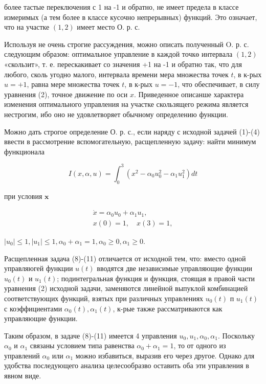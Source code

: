 \documentclass[10pt]{article}
\begin{document}
более тастые переключения с 1 на -1 и обратно, не имеет предела в классе измеримых (а тем более в классе кусочно непрерывных) функций. Это означает, что на участке $(1,2)$ имеет место О. р. с.

Используя не очень строгие рассуждения, можно описать полученный O. р. с. следующим образом: оптимальное управление в каждой точкө интервала $(1,2)$ «скользит», т. е. перескакивает со значения +1 на -1 и обратно так, что для любого, сколь угодно малого, интервала времени мера множества точек $t$, в к-рых $u=+1$, равна мере множества точек $t$, в к-рых $u=-1$, что обеспечивает, в силу уравнения (2), точное движение по оси $x$. Приведенное описанше характера изменения оптимального управления на участке скользящего режима является нестрогим, ибо оно не удовлетворяет обычному определению функции.

Можно дать строгое определение О. р. с., если наряду с исходной задачей (1)-(4) ввести в рассмотрение вспомогательную, расщепленную задачу: найти минимум функционала

\[
I(x, \alpha, u)=\int_{0}^{3}\left(x^{2}-\alpha_{0} u_{0}^{2}-\alpha_{1} u_{1}^{2}\right) d t
\]

при условия $\mathbf{x}$

\[
\begin{gathered}
\dot{x}=\alpha_{0} u_{0}+\alpha_{1} u_{1}, \\
x(0)=1, \quad x(3)=1,
\end{gathered}
\]

$\left|u_{0}\right| \leqslant 1,\left|u_{1}\right| \leqslant 1, \alpha_{0}+\alpha_{1}=1, \alpha_{0} \geqslant 0, \alpha_{1} \geqslant 0$.

Расщепленная задача (8)-(11) отличается от исходной тем, что: вместо одной управляюгей функции $u(t)$ вводятся две независимые управляющие функции $u_{0}(t)$ и $u_{1}(t)$; подинтегральная функция и функция, стоящая в правой части уравнения (2) исходной задачи, заменяются линейной выпуклой комбинацией соответствующих функций, взятых при различных управлениях $u_{0}(t)$ п $u_{1}(t)$ с коэффициентами $\alpha_{0}(t), \alpha_{1}(t)$, к-рые также рассматриваются как управляющие функции.

Таким образом, в задаче (8)-(11) имеется 4 управления $u_{0}, u_{1}, \alpha_{0}, \alpha_{1}$. Поскольку $\alpha_{0}$ и $\alpha_{1}$ связаны условием типа равенства $\alpha_{0}+\alpha_{1}=1$, то от одного из управлений $\alpha_{0}$ или $\alpha_{1}$ можно избавиться, выразив его через другое. Однако для удобства последующего анализа целесообразво оставить оба эти управления в явном виде.
\end{document}
